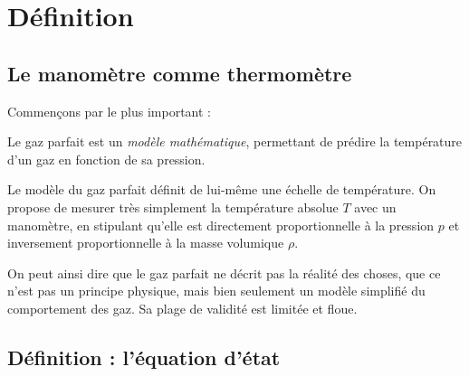 \section{Définition}

	\subsection{Le manomètre comme thermomètre}
	\label{ch_le_manomètre_comme_thermomètre}

		Commençons par le plus important :

		\begin{trucimportant}
			Le gaz parfait est un \textit{modèle mathématique},\linebreak
			permettant de prédire la température d’un gaz en fonction de sa pression.
		\end{trucimportant}

		Le modèle du gaz parfait définit de lui-même une échelle de température. On propose de mesurer très simplement la température absolue $T$ avec un manomètre, en stipulant qu’elle est directement proportionnelle à la pression $p$ et inversement proportionnelle à la masse volumique $\rho$.

		On peut ainsi dire que le gaz parfait ne décrit pas la réalité des choses, que ce n’est pas un principe physique, mais bien seulement un modèle simplifié du comportement des gaz. Sa plage de validité est limitée et floue.



		\subsection{Définition : l’équation d’état}

